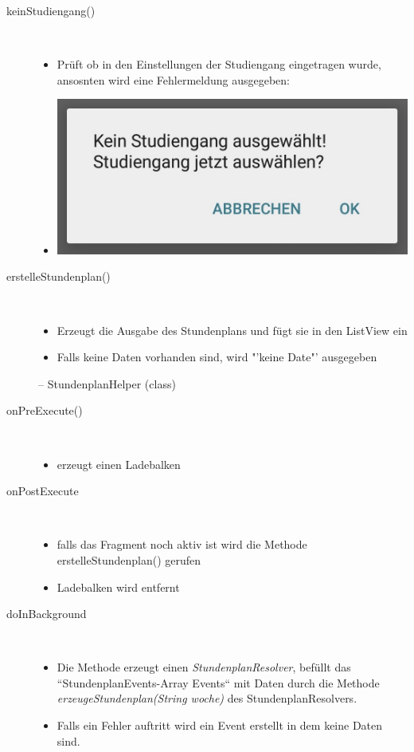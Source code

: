 \begin{description}
\item[keinStudiengang()]~\par
\begin{itemize}
\item Prüft ob in den Einstellungen der Studiengang eingetragen wurde, ansosnten wird eine Fehlermeldung ausgegeben:
\item[] \includegraphics[scale=0.5]{05_Handbuch/img/Studiengang.jpg}
\end{itemize}

\item[erstelleStundenplan()]~\par
\begin{itemize}
\item Erzeugt die Ausgabe des Stundenplans und fügt sie in den ListView ein
\item Falls keine Daten vorhanden sind, wird "'keine Date"' ausgegeben
\end{itemize}
 
-- StundenplanHelper (class)
 
\item[onPreExecute()]~\par
\begin{itemize}
\item erzeugt einen Ladebalken
\end{itemize}
\item[onPostExecute]~\par
\begin{itemize}
\item falls das Fragment noch aktiv ist wird die Methode erstelleStundenplan() gerufen
\item Ladebalken wird entfernt
\end{itemize}
 
\item[doInBackground]~\par
\begin{itemize}
\item Die Methode erzeugt einen \textit{StundenplanResolver},
befüllt das “StundenplanEvents-Array Events“ mit Daten durch die Methode \textit{erzeugeStundenplan(String woche)} des StundenplanResolvers.
\item Falls ein Fehler auftritt wird ein Event erstellt in dem keine Daten sind.
\end{itemize}


\end{description}
